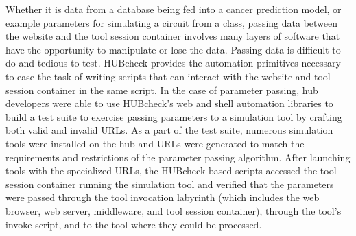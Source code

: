 Whether it is data from a database being fed into a cancer prediction model, or
example parameters for simulating a circuit from a class, passing data between
the website and the tool session container involves many layers of software
that have the opportunity to manipulate or lose the data. Passing data is
difficult to do and tedious to test.  HUBcheck provides the automation
primitives necessary to ease the task of writing scripts that can interact with
the website and tool session container in the same script. In the case of
parameter passing, hub developers were able to use HUBcheck's web and shell
automation libraries to build a test suite to exercise passing parameters to a
simulation tool by crafting both valid and invalid URLs. As a part of the test
suite, numerous simulation tools were installed on the hub and URLs were
generated to match the requirements and restrictions of the parameter passing
algorithm. After launching tools with the specialized URLs, the HUBcheck based
scripts accessed the tool session container running the simulation tool and
verified that the parameters were passed through the tool invocation labyrinth
(which includes the web browser, web server, middleware, and tool session
container), through the tool's invoke script, and to the tool where they could
be processed.


